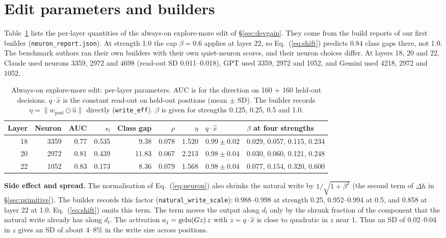 \section{Edit parameters and builders}
\label{app:params}
Table~\ref{tab:params} lists the per-layer quantities of the always-on explore-more edit of \S\ref{sec:devgain}. They come from the build reports of our first builder (\texttt{neuron\_report.json}). At strength 1.0 the cap $\beta = 0.6$ applies at layer 22, so Eq.~(\ref{eq:shift}) predicts 0.84 class gaps there, not 1.0. The benchmark authors ran their own builders with their own quiet-neuron scores, and their neuron choices differ. At layers 18, 20 and 22, Claude used neurons 3359, 2972 and 4698 (read-out SD 0.011--0.018), GPT used 3359, 2972 and 1052, and Gemini used 4218, 2972 and 1052.

\begin{table}[h]
\caption{Always-on explore-more edit: per-layer parameters. AUC is for the direction on 160 + 160 held-out decisions. $q \cdot \hat{x}$ is the constant read-out on held-out positions (mean $\pm$ SD). The builder records $\eta = \lVert w_{\mathrm{post}} \odot \hat{u} \rVert$ directly (\texttt{write\_eff}). $\beta$ is given for strengths 0.125, 0.25, 0.5 and 1.0.}
\label{tab:params}
\centering
\small
\setlength{\tabcolsep}{4pt}
\begin{tabular}{rrrrrrrll}
\toprule
Layer & Neuron & AUC \up & $s_l$ & Class gap & $\rho$ & $\eta$ & $q \cdot \hat{x}$ & $\beta$ at four strengths \\
\midrule
18 & 3359 & 0.77 & 0.535 & 9.38 & 0.078 & 1.520 & $0.99 \pm 0.02$ & 0.029, 0.057, 0.115, 0.234 \\
20 & 2972 & 0.81 & 0.439 & 11.83 & 0.067 & 2.213 & $0.98 \pm 0.04$ & 0.030, 0.060, 0.121, 0.248 \\
22 & 1052 & 0.83 & 0.173 & 8.36 & 0.079 & 1.568 & $0.98 \pm 0.04$ & 0.077, 0.154, 0.320, 0.600 \\
\bottomrule
\end{tabular}
\end{table}

\textbf{Side effect and spread.} The normalisation of Eq.~(\ref{eq:neuron}) also shrinks the natural write by $1/\sqrt{1+\beta^2}$ (the second term of $\Delta h$ in \S\ref{sec:primitive}). The builder records this factor (\texttt{natural\_write\_scale}): 0.988--0.998 at strength 0.25, 0.952--0.994 at 0.5, and 0.858 at layer 22 at 1.0. Eq.~(\ref{eq:shift}) omits this term. The term moves the output along $d_l$ only by the shrunk fraction of the component that the natural write already has along $d_l$. The activation $a_j = \mathrm{gelu}(G z)\, z$ with $z = q \cdot \hat{x}$ is close to quadratic in $z$ near 1. Thus an SD of 0.02--0.04 in $z$ gives an SD of about 4--8\% in the write size across positions.

